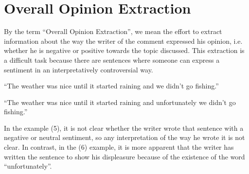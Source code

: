 \section{Overall Opinion Extraction}
By the term  ``Overall Opinion Extraction'', we mean the effort to extract information about the way the writer of the comment expressed  his opinion, i.e. whether he is negative or positive towards the topic discussed. This extraction is a difficult task because there are sentences where someone can express a sentiment in an interpretatively controversial way.\\
\begin{example}
	``The weather was nice until it started raining and we didn't go fishing.''\\
\end{example}
\begin{example}
	``The weather was nice until it started raining and unfortunately we didn't go fishing.''\\
\end{example}
In the example (5), it is not clear whether the writer wrote that sentence with a negative or neutral sentiment, so any interpretation of the way he wrote it is not clear. In contrast, in the (6) example, it is more apparent that the writer has written the sentence to show his displeasure because of the existence of the word ``unfortunately''.